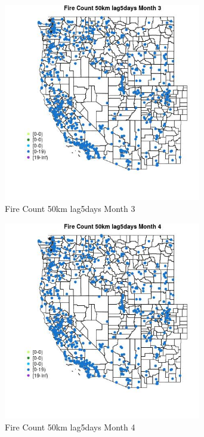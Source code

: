 \begin{figure} 
\centering  
\includegraphics[width=0.77\textwidth]{Code_Outputs/Report_ML_input_PM25_Step4_part_e_de_duplicated_aves_compiled_2019-05-21wNAs_MapObsMo3Fire_Count_50km_lag5days.jpg} 
\caption{\label{fig:Report_ML_input_PM25_Step4_part_e_de_duplicated_aves_compiled_2019-05-21wNAsMapObsMo3Fire_Count_50km_lag5days}Fire Count 50km lag5days Month 3} 
\end{figure} 
 

\begin{figure} 
\centering  
\includegraphics[width=0.77\textwidth]{Code_Outputs/Report_ML_input_PM25_Step4_part_e_de_duplicated_aves_compiled_2019-05-21wNAs_MapObsMo4Fire_Count_50km_lag5days.jpg} 
\caption{\label{fig:Report_ML_input_PM25_Step4_part_e_de_duplicated_aves_compiled_2019-05-21wNAsMapObsMo4Fire_Count_50km_lag5days}Fire Count 50km lag5days Month 4} 
\end{figure} 
 

